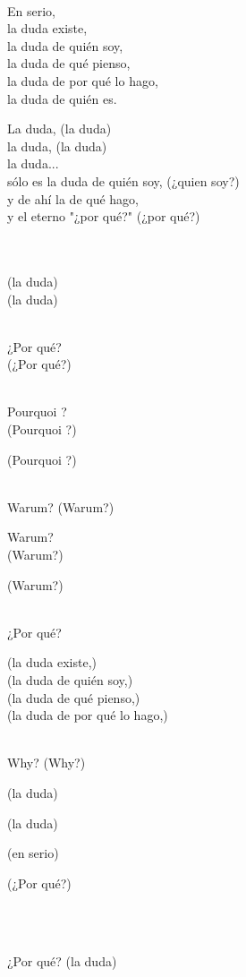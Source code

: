 \begin{lyrics}

\\
En serio,\\
la duda existe,\\
la duda de quién soy,\\
la duda de qué pienso,\\
la duda de por qué lo hago,\\
la duda de quién es.

 La duda,   (la duda)\\
 la duda,  (la duda)\\
 la duda...\\
sólo es la duda de quién soy, (¿quien soy?)\\
y de ahí la de qué hago,\\
y el eterno "¿por qué?" (¿por qué?)


\\
\\
(la duda)\\
(la duda)

\\
¿Por qué?\\
(¿Por qué?)

\\
Pourquoi ?\\
(Pourquoi ?)

(Pourquoi ?)

\\
Warum?
(Warum?)

Warum?\\
(Warum?)

(Warum?)

\\
¿Por qué?

(la duda existe,)\\
(la duda de quién soy,)\\
(la duda de qué pienso,)\\
(la duda de por qué lo hago,)

\\
Why?
(Why?)

(la duda)

(la duda)

(en serio)

(¿Por qué?)

\\

\\
¿Por qué? (la duda)
\end{lyrics}

